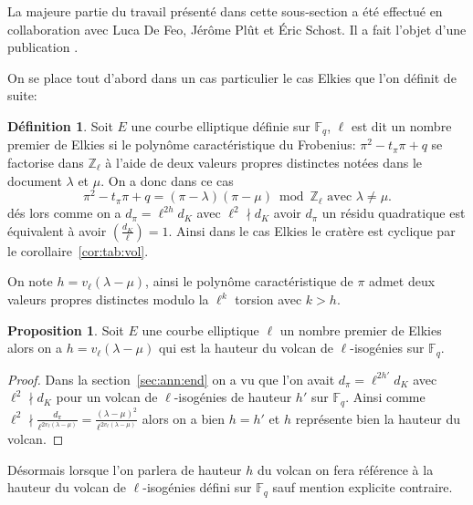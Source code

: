 \documentclass[10pt,a4paper]{book}
\theoremstyle{plain}
\theoremstyle{definition}
\theoremstyle{definition}
\theoremstyle{definition}
\newtheorem{prop}[thm]{Proposition}
\theoremstyle{definition}
\newtheorem{defi}[thm]{Définition}
\theoremstyle{remark}
\theoremstyle{remark}
\theoremstyle{definition}
\begin{document}
La majeure partie du travail présenté dans cette sous-section a été effectué en collaboration avec Luca De Feo, Jér\^ome Pl\^ut et \'Eric Schost. Il a fait l'objet d'une publication \cite{Defeo_Plut_Schost_2016}.

 On se place tout d'abord dans un cas particulier le cas Elkies que l'on définit de suite: 
\begin{defi}
\label{def:cas:elk}
Soit $E$ une courbe elliptique définie sur $\mathbb{F}_q$, $\ell$ est dit un nombre premier de Elkies si le polynôme caractéristique du Frobenius: $\pi^2-t_{\pi}\pi + q$ se factorise dans $\mathbb{Z}_{\ell}$ à l'aide de deux valeurs propres distinctes notées dans le document $\lambda$ et $\mu$. On a donc dans ce cas
\begin{equation*}
\pi^2 - t_{\pi}\pi + q = (\pi - \lambda)(\pi - \mu) \bmod \mathbb{Z}_{\ell} \text{ avec } \lambda \neq \mu.
\end{equation*}
dés lors comme on a $d_{\pi}=\ell^{2h}d_{K}$ avec $\ell^2 \nmid d_{K}$ avoir 
$d_{\pi}$ un résidu quadratique est équivalent à avoir $\left( 
\frac{d_{K}}{\ell} \right)=1$. Ainsi dans le cas Elkies le cratère est cyclique
par le corollaire~\ref{cor:tab:vol}.
\end{defi}

On note $h=v_{\ell}(\lambda - \mu)$, ainsi le polynôme caractéristique de $\pi$ admet deux valeurs propres distinctes modulo la $\ell^k$ torsion avec $k > h$.

\begin{prop}
\label{pro:hau:vol}
Soit $E$ une courbe elliptique $\ell$ un nombre premier de Elkies alors on a 
$h=v_{\ell}(\lambda - \mu)$ qui est la hauteur du volcan de $\ell$-isogénies 
sur $\mathbb{F}_q$.
\end{prop}

\begin{proof}
Dans la section~\ref{sec:ann:end} on a vu que l'on avait $d_{\pi}=\ell^{2h'}d_K$ 
avec $\ell^2 \nmid d_K$ pour un volcan de $\ell$-isogénies de hauteur $h'$ sur 
$\mathbb{F}_q$. Ainsi comme $\ell^{2} \nmid  \frac{d_\pi}{\ell^{2 v_{\ell}
(\lambda - \mu)}}=\frac{(\lambda - \mu)^2}{\ell^{2 v_{\ell}(\lambda - \mu)}}$ 
alors on a bien $h=h'$ et $h$ représente bien la hauteur du volcan. 
\end{proof}
 
Désormais lorsque l'on parlera de hauteur $h$ du volcan on fera référence à la
hauteur du volcan de $\ell$-isogénies défini sur $\mathbb{F}_q$ sauf mention 
explicite contraire.
\end{document}
